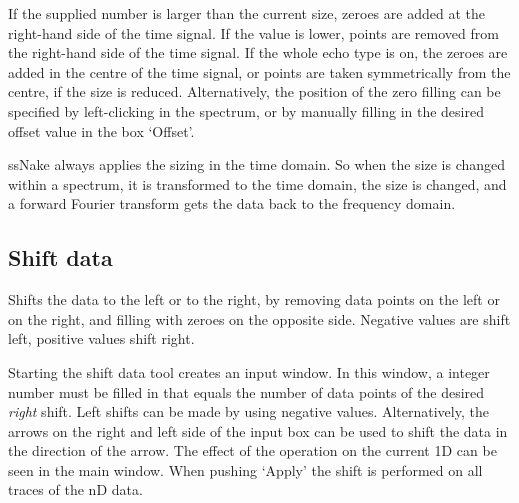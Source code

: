 \documentclass[11pt,a4paper]{article}
\begin{document}
If the supplied number is larger than the current size, zeroes are added at the right-hand side of the time signal.
If the value is lower, points are removed from the right-hand side of the time signal.
If the whole echo type is on, the zeroes are added in the centre of the time signal, or points are taken symmetrically from the centre, if the size is reduced.
Alternatively, the position of the zero filling can be specified by left-clicking in the spectrum, or by manually filling in the desired offset value in the box `Offset'.

ssNake always applies the sizing in the time domain.
So when the size is changed within a spectrum, it is transformed to the time domain, the size is changed, and a forward Fourier transform gets the data back to the frequency domain.

\subsection{Shift data}
Shifts the data to the left or to the right, by removing data points on the left or on the right, and filling with zeroes on the opposite side.
Negative values are shift left, positive values shift right.


Starting the shift data tool creates an input window.
In this window, a integer number must be filled in that equals the number of data points of the desired \textit{right} shift.
Left shifts can be made by using negative values.
Alternatively, the arrows on the right and left side of the input box can be used to shift the data in the direction of the arrow.
The effect of the operation on the current 1D can be seen in the main window.
When pushing `Apply' the shift is performed on all traces of the nD data.
\end{document}
